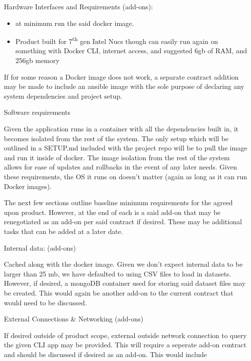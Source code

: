 Hardware Interfaces and Requirements (add-ons):

\begin{itemize}
\item
  at minimum run the said docker image.
\item
  Product built for 7\textsuperscript{th} gen Intel Nucs though can
  easily run again on something with Docker CLI, internet access, and
  suggested 6gb of RAM, and 256gb memory
\end{itemize}

If for some reason a Docker image does not work, a separate contract
addition may be made to include an ansible image with the sole purpose
of declaring any system dependencies and project setup.

Software requirements

Given the application runs in a container with all the dependencies
built in, it becomes isolated from the rest of the system. The only
setup which will be outlined in a SETUP.md included with the project
repo will be to pull the image and run it inside of docker. The image
isolation from the rest of the system allows for ease of updates and
rollbacks in the event of any later needs. Given these requirements, the
OS it runs on doesn't matter (again as long as it can run Docker
images).

The next few sections outline baseline minimum requirements for the
agreed upon product. However, at the end of each is a said add-on that
may be renegotiated as an add-on per said contract if desired. These may
be additional tasks that can be added at a later date.

Internal data: (add-ons)

Cached along with the docker image. Given we don't expect internal data
to be larger than 25 mb, we have defaulted to using CSV files to load in
datasets. However, if desired, a mongoDB container used for storing said
dataset files may be created. This would again be another add-on to the
current contract that would need to be discussed.

External Connections \& Networking (add-ons)

If desired outside of product scope, external outside network connection
to query the given CLI app may be provided. This will require a seperate
add-on contract and should be discussed if desired as an add-on. This
would include

